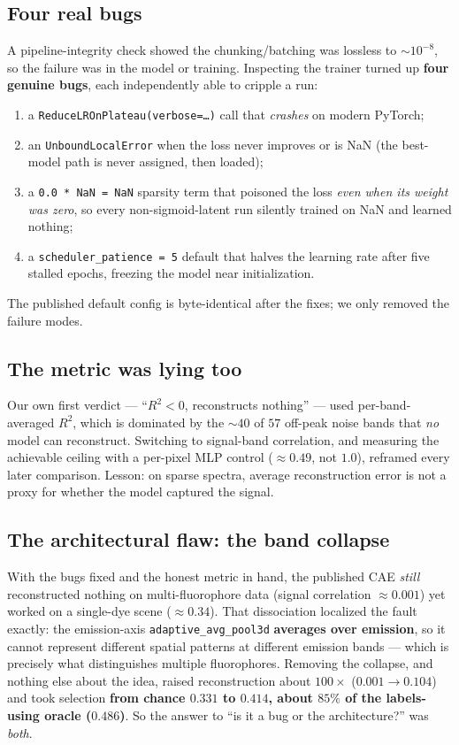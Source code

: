 \documentclass[11pt]{article}
\newcommand{\code}[1]{\texttt{\textcolor{codecol}{#1}}}
\begin{document}
\subsection{Four real bugs}
A pipeline-integrity check showed the chunking/batching was lossless to $\sim 10^{-8}$, so the
failure was in the model or training. Inspecting the trainer turned up \textbf{four genuine bugs},
each independently able to cripple a run:
\begin{enumerate}[leftmargin=1.6em,itemsep=0.1em]
\item a \code{ReduceLROnPlateau(verbose=\dots)} call that \emph{crashes} on modern PyTorch;
\item an \code{UnboundLocalError} when the loss never improves or is NaN (the best-model path is
never assigned, then loaded);
\item a \code{0.0 * NaN = NaN} sparsity term that poisoned the loss \emph{even when its weight was
zero}, so every non-sigmoid-latent run silently trained on NaN and learned nothing;
\item a \code{scheduler\_patience = 5} default that halves the learning rate after five stalled
epochs, freezing the model near initialization.
\end{enumerate}
The published default config is byte-identical after the fixes; we only removed the failure modes.

\subsection{The metric was lying too}
Our own first verdict --- ``$R^2 < 0$, reconstructs nothing'' --- used per-band-averaged $R^2$, which
is dominated by the $\sim 40$ of $57$ off-peak noise bands that \emph{no} model can reconstruct.
Switching to signal-band correlation, and measuring the achievable ceiling with a per-pixel MLP
control ($\approx 0.49$, not $1.0$), reframed every later comparison. Lesson: on sparse spectra,
average reconstruction error is not a proxy for whether the model captured the signal.

\subsection{The architectural flaw: the band collapse}
With the bugs fixed and the honest metric in hand, the published CAE \emph{still} reconstructed
nothing on multi-fluorophore data (signal correlation $\approx 0.001$) yet worked on a single-dye
scene ($\approx 0.34$). That dissociation localized the fault exactly: the emission-axis
\code{adaptive\_avg\_pool3d} \textbf{averages over emission}, so it cannot represent different spatial
patterns at different emission bands --- which is precisely what distinguishes multiple fluorophores.
Removing the collapse, and nothing else about the idea, raised reconstruction about $100\times$
($0.001 \to 0.104$) and took selection \textbf{from chance $0.331$ to $0.414$, about $85\%$ of the
labels-using oracle ($0.486$)}. So the answer to ``is it a bug or the architecture?'' was
\emph{both}.
\end{document}
